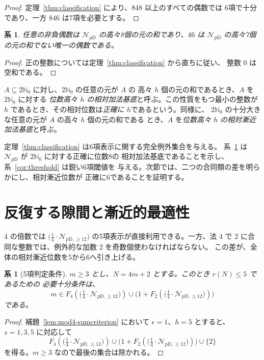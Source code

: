 \documentclass[12pt]{ltjsarticle}
\theoremstyle{plain}
\newtheorem{corollary}[theorem]{系}
\theoremstyle{definition}
\theoremstyle{plain}
\newcommand{\NpD}{\mathcal{N}_{\mathrm{pD}}}
\newcommand{\Pset}{%
  \bigl(\tfrac{1}{4}\cdot\mathcal{N}_{\mathrm{pD},\geq 12}\bigr)%
}
\begin{document}
\begin{proof}
定理~\ref{thm:classification} により、$848$ 以上のすべての偶数では
6項で十分であり、一方 $846$ は7項を必要とする。
\end{proof}

\begin{corollary}\label{cor:eight}
任意の非負偶数は $\NpD$ の高々8個の元の和であり、$46$ は
$\NpD$ の高々7個の元の和でない唯一の偶数である。
\end{corollary}

\begin{proof}
正の整数については定理~\ref{thm:classification} から直ちに従い、
整数 $0$ は空和である。
\end{proof}

$A\subseteq2\mathbb N_0$ に対し、$2\mathbb N_0$ の任意の元が $A$ の
高々 $h$ 個の元の和であるとき、$A$ を $2\mathbb N_0$ に対する
\emph{位数高々 $h$ の相対加法基底}と呼ぶ。この性質をもつ最小の整数が
$h$ であるとき、その相対位数は\emph{正確に $h$}であるという。同様に、
$2\mathbb N_0$ の十分大きな任意の元が $A$ の高々 $h$ 個の元の和である
とき、$A$ を\emph{位数高々 $h$ の相対漸近加法基底}と呼ぶ。

定理~\ref{thm:classification} は6項表示に関する完全例外集合を与える。
系~\ref{cor:eight} は $\NpD$ が $2\mathbb N_0$ に対する正確に位数8の
相対加法基底であることを示し、系~\ref{cor:threshold} は鋭い6項閾値を
与える。次節では、二つの合同類の差を明らかにし、相対漸近位数が
正確に6であることを証明する。

\section{反復する隙間と漸近的最適性}\label{sec:asymptotic}

$4$ の倍数では $\Pset$ の5項表示が直接利用できる。一方、法 $4$ で
$2$ に合同な整数では、例外的な加数 $2$ を奇数個使わなければならない。
この差が、全体の相対漸近位数を5から6へ引き上げる。

\begin{corollary}[5項判定条件]\label{cor:fivecrit}
$m\geq3$ とし、$N=4m+2$ とする。このとき $r(N)\leq5$ であるための
必要十分条件は、
\begin{equation}\label{eq:fivecrit}
 m\in F_4(\Pset)\cup\bigl(1+F_2(\Pset)\bigr)
\end{equation}
である。
\end{corollary}

\begin{proof}
補題~\ref{lem:mod4-sumcriterion} において $\epsilon=1$、$h=5$ とすると、
$s=1,3,5$ に対応して
\[
 F_4(\Pset)\cup\bigl(1+F_2(\Pset)\bigr)\cup\{2\}
\]
を得る。$m\geq3$ なので最後の集合は除かれる。
\end{proof}
\end{document}
